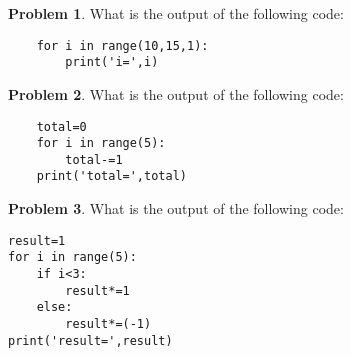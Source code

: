\documentclass[10pt]{article}
\theoremstyle{definition}
\newtheorem{problem}{Problem}
\begin{document}
\newpage
\begin{problem}
    What is the output of the following code:
\end{problem}
\begin{lstlisting}
    for i in range(10,15,1):
        print('i=',i)
\end{lstlisting}
\vspace{2in}

\begin{problem}
    What is the output of the following code:
\end{problem}
\begin{lstlisting}
    total=0
    for i in range(5):
        total-=1
    print('total=',total)
\end{lstlisting}
\vspace{2in}

\begin{problem}
    What is the output of the following code:
\end{problem}
\begin{lstlisting}
result=1
for i in range(5):
    if i<3:
        result*=1
    else:
        result*=(-1)
print('result=',result)
\end{lstlisting}
\end{document}
